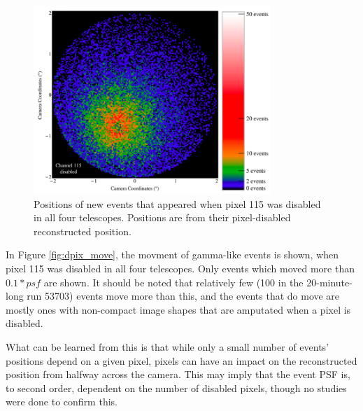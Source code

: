     \begin{figure}[ht]
      \centering
      \includegraphics[width=0.8\textwidth]{images/disabled_pixel/appearing_events}
      \caption[Newly Appearing Events]{
        Positions of new events that appeared when pixel 115 was disabled in all four telescopes.
        Positions are from their pixel-disabled reconstructed position.
      }
      \label{fig:dpix_appear}
    \end{figure}

    In Figure \ref{fig:dpix_move}, the movment of gamma-like events is shown, when pixel 115 was disabled in all four telescopes.
    Only events which moved more than $0.1*psf$ are shown.
    It should be noted that relatively few (\nicetilde{}100 in the 20-minute-long run 53703) events move more than this, and the events that do move are mostly ones with non-compact image shapes that are amputated when a pixel is disabled.

    What can be learned from this is that while only a small number of events' positions depend on a given pixel, pixels can have an impact on the reconstructed position from halfway across the camera.
    This may imply that the event PSF is, to second order, dependent on the number of disabled pixels, though no studies were done to confirm this.


